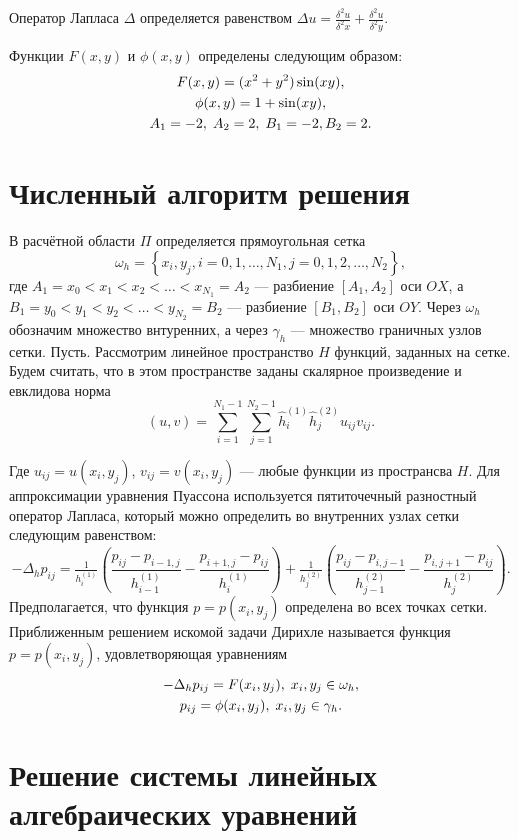 \documentclass[12pt]{article}
\theoremstyle{rusdef}
\begin{document}
	Оператор Лапласа $\Delta$ определяется равенством $\Delta u= \tfrac{\delta^2 u}{\delta^2 x} + \tfrac{\delta^2 u}{\delta^2 y}$.
	
	Функции $F(x,y)$ и $\phi(x,y)$ определены следующим образом:
	\begin{gather}
	F(x,y)=(x^2+y^2)\sin(xy), \notag \\
	\phi(x,y)=1+\sin(xy), \notag \\
	A_1=-2,\;A_2=2,\;B_1= -2,B_2=2. \notag
	\end{gather}
	
	
	\section{Численный алгоритм решения}
	
	В расчётной области $\Pi$ определяется прямоугольная сетка $$\omega_h=\left\{x_i,y_j,i=0,1,\ldots,N_1,j=0,1,2,\ldots,N_2\right\},$$
	где $A_1=x_0<x_1<x_2<\ldots<x_{N_1}=A_2$ --- разбиение $[A_1,A_2]$ оси $OX$,
	а $B_1=y_0<y_1<y_2<\ldots<y_{N_2}=B_2$ --- разбиение $[B_1,B_2]$ оси $OY$.
	Через $\omega_h$ обозначим множество внтуренних, а через $\gamma_h$ --- множество граничных узлов сетки. Пусть.
	Рассмотрим линейное пространство $H$ функций, заданных на сетке. Будем считать, что в этом пространстве заданы скалярное произведение и евклидова норма
	$$(u,v) = \sum\limits_{i=1}^{N_1-1} \sum\limits_{j=1}^{N_2-1} \hat{h}_i^{(1)} \hat{h}_j^{(2)} u_{ij}v_{ij}.$$
	
	Где $u_{ij}=u(x_i,y_j)$, $v_{ij}=v(x_i,y_j)$ --- любые функции из пространсва $H$.
	Для аппроксимации уравнения Пуассона используется пятиточечный разностный оператор Лапласа, который можно определить во внутренних узлах сетки следующим равенством:
	$$
	-\Delta_h p_{ij}= \tfrac{1}{h_i^{(1)}}\left( \frac{p_{ij} - p_{i-1,j}}{h_{i-1}^{(1)}} -\frac{p_{i+1,j} - p_{ij}}{h_i^{(1)}} \right) + \tfrac{1}{h_j^{(2)}}\left( \frac{p_{ij} - p_{i,j-1}}{h_{j-1}^{(2)}} -\frac{p_{i,j+1} - p_{ij}}{h_j^{(2)}} \right).
	$$
	Предполагается, что функция $p=p(x_i,y_j)$ определена во всех точках сетки. Приближенным решением искомой задачи Дирихле называется функция $p=p(x_i,y_j)$, удовлетворяющая уравнениям
	\begin{gather}
	-\Delta_h p_{ij}=F(x_i,y_j),\; x_i,y_j \in \omega_h, \notag \\
	p_{ij} = \phi(x_i,y_j), \; x_i,y_j\in \gamma_h. \notag
	\end{gather}
	
	
	\section{Решение системы линейных алгебраических уравнений}
	
\end{document}
